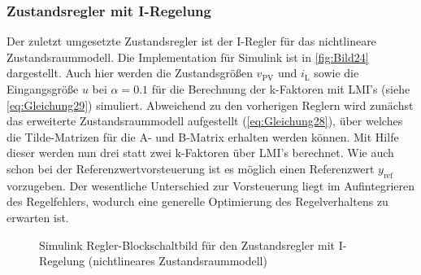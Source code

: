 \subsubsection{Zustandsregler mit I-Regelung}

Der zuletzt umgesetzte Zustandsregler ist der I-Regler für das nichtlineare Zustandsraummodell. Die Implementation für Simulink ist in \autoref{fig:Bild24} dargestellt. Auch hier werden die Zustandsgrößen $v_{\mathrm{PV}}$ und $i_{\mathrm{L}}$ sowie die Eingangsgröße $u$ bei $\alpha = 0.1$ für die Berechnung der k-Faktoren mit LMI's (siehe \autoref{eq:Gleichung29}) simuliert. Abweichend zu den vorherigen Reglern wird zunächst das erweiterte Zustandsraummodell aufgestellt (\autoref{eq:Gleichung28}), über welches die Tilde-Matrizen für die A- und B-Matrix erhalten werden können. Mit Hilfe dieser werden nun drei statt zwei k-Faktoren über LMI's berechnet. Wie auch schon bei der Referenzwertvorsteuerung ist es möglich einen Referenzwert $y_{\mathrm{ref}}$ vorzugeben. Der wesentliche Unterschied zur Vorsteuerung liegt im Aufintegrieren des Regelfehlers, wodurch eine generelle Optimierung des Regelverhaltens zu erwarten ist.

\begin{figure}[H]
    \centering
    \caption[Zustandsregler mit I-Regelung Simulink (nichtlinear)]{Simulink Regler-Blockschaltbild für den Zustandsregler mit I-Regelung (nichtlineares Zustandsraummodell)}
    \label{fig:Bild24}
\end{figure}

